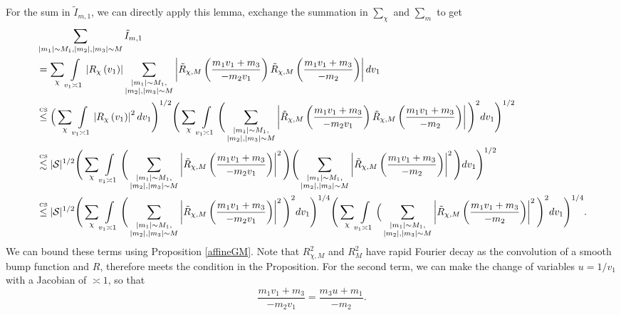 For the sum in $\tilde{I}_{m,1}$, we can directly apply this lemma, exchange the summation in $\sum_\chi$ and $\sum_m$ to get \begin{align*}
    &\sum_{\substack {|m_1|\sim M_1,|m_2|,|m_3|\sim M}}\tilde{I}_{m,1}\\
   &  =\sum_{\chi}\int\displaylimits_{v_1\asymp 1}  \left|R_\chi\left(v_1\right)\right|\sum_{\substack {|m_1|\sim M_1,\\|m_2|,|m_3|\sim M}}\left| \tilde{R}_{\chi,M}\left(\frac{m_1v_1+m_3}{-m_2v_1}\right)
    \tilde{R}_{\chi,M}\left(\frac{m_1v_1+m_3}{-m_2}\right)\right|dv_1\\
    &\stackon{CS}{\leq} \Big( \sum_{\chi}\int\displaylimits_{v_1\asymp 1}  \left|R_\chi\left(v_1\right)\right|^2 dv_1 \Bigg)^{1/2} \Bigg(\sum_{\chi}\int\displaylimits_{v_1\asymp 1}\Bigg(\sum_{\substack {|m_1|\sim M_1,\\|m_2|,|m_3|\sim M}}\left| \tilde{R}_{\chi,M}\left(\frac{m_1v_1+m_3}{-m_2v_1}\right)
    \tilde{R}_{\chi,M}\left(\frac{m_1v_1+m_3}{-m_2}\right)\right|\Bigg)^2dv_1\Bigg)^{1/2}\\
    &\stackon{CS}{\lesssim} |\mathcal{S}|^{1/2} \Bigg(\sum_{\chi}\int\displaylimits_{v_1\asymp 1}\Bigg(\sum_{\substack {|m_1|\sim M_1,\\|m_2|,|m_3|\sim M}}\left| \tilde{R}_{\chi,M}\left(\frac{m_1v_1+m_3}{-m_2v_1}\right)\right|^2 \Bigg)\Bigg(\sum_{\substack {|m_1|\sim M_1,\\|m_2|,|m_3|\sim M}}\left|
    \tilde{R}_{\chi,M}\left(\frac{m_1v_1+m_3}{-m_2}\right)\right|^2\Bigg)dv_1\Bigg)^{1/2}\\
    &\stackon{CS}{\leq}|\mathcal{S}|^{1/2} \Bigg(\sum_{\chi}
    \int\displaylimits_{v_1\asymp 1}\Bigg(\sum_{\substack {|m_1|\sim M_1,\\|m_2|,|m_3|\sim M}}\left| \tilde{R}_{\chi,M}\left(\frac{m_1v_1+m_3}{-m_2v_1}\right)\right|^2\Bigg)^2 dv_1 \Bigg)^{1/4}\Bigg(\sum_{\chi}
    \int\displaylimits_{v_1\asymp 1}\Big(
    \sum_{\substack {|m_1|\sim M_1,\\|m_2|,|m_3|\sim M}}\left|
    \tilde{R}_{\chi,M}\left(\frac{m_1v_1+m_3}{-m_2}\right)\right|^2\Bigg)^2dv_1\Bigg)^{1/4}.
\end{align*} 
We can bound these terms using Proposition \ref{affineGM}. Note that $R_{\chi,M}^2$ and $R_M^2$ have rapid Fourier decay as the convolution of a smooth bump function and $R$, therefore meets the condition in the Proposition.
For the second term, we can make the change of variables $u=1/v_1$ with a Jacobian of $\asymp 1$, so that \[
\frac{m_1v_1+m_3}{-m_2v_1}= \frac{m_3u + m_1}{-m_2}.
\]
